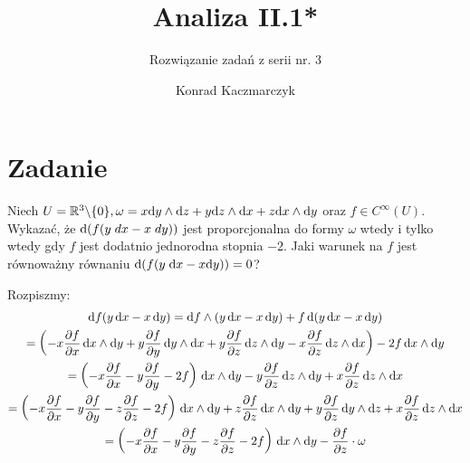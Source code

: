 \documentclass[11pt]{scrartcl}
\author{Konrad Kaczmarczyk}
\begin{document}
\title{Analiza II.1*}
    \subtitle{Rozwiązanie zadań z serii nr. 3}
    \maketitle

    \section{Zadanie}
        
    \begin{zadanie*}
        Niech $
        U = \mathbb R^3 \backslash \{ 0 \}, 
        \omega = x \text{d} y \wedge \text{d} z 
            + y \text{d} z \wedge \text{d} x 
            + z \text{d} x \wedge \text{d} y
        $
        oraz $f \in C^\infty (U)$. Wykazać, że $\text{d} (f(y \; dx - x \; dy))$ jest
        proporcjonalna do formy $\omega$ wtedy i tylko wtedy gdy $f$ jest 
        dodatnio jednorodna stopnia $-2$. Jaki warunek na $f$ jest równoważny 
        równaniu $\text{d} (f(y \; \text{d} x - x \text{d} y)) = 0$?
    \end{zadanie*}

    Rozpiszmy:
    \begin{gather*}
        \text{d} f (y \, \text{d} x - x \, \text{d} y) = 
        \text{d} f \wedge (y \, \text{d} x - x \, \text{d} y) 
            + f \, \text{d} (y \, \text{d} x - x \, \text{d} y) \\
        = \left ( 
            - x \frac{\partial f}{\partial x} \, \text{d} x \wedge \text{d} y 
            + y \frac{\partial f}{\partial y} \, \text{d} y \wedge \text{d} x 
            + y \frac{\partial f}{\partial z} \, \text{d} z \wedge \text{d} y 
            - x \frac{\partial f}{\partial z} \, \text{d} z \wedge \text{d} x 
        \right ) - 2f \, \text{d} x \wedge \text{d} y \\
        = \left ( 
            - x \frac{\partial f}{\partial x} 
            - y \frac{\partial f}{\partial y} - 2f 
        \right ) \, \text{d} x \wedge \text{d} y 
        - y \frac{\partial f}{\partial z} \, \text{d} z \wedge \text{d} y
        + x \frac{\partial f}{\partial z} \, \text{d} z \wedge \text{d} x \\
        = \left ( 
            - x \frac{\partial f}{\partial x} 
            - y \frac{\partial f}{\partial y} 
            - z \frac{\partial f}{\partial z} - 2f
        \right ) \, \text{d} x \wedge \text{d} y 
        + z \frac{\partial f}{\partial z} \, \text{d} x \wedge \text{d} y
        + y \frac{\partial f}{\partial z} \, \text{d} y \wedge \text{d} z
        + x \frac{\partial f}{\partial z} \, \text{d} z \wedge \text{d} x \\
        = \left ( 
            - x \frac{\partial f}{\partial x} 
            - y \frac{\partial f}{\partial y} 
            - z \frac{\partial f}{\partial z} - 2f
        \right ) \, \text{d} x \wedge \text{d} y 
        - \frac{\partial f}{\partial z} \cdot \omega
    \end{gather*}
\end{document}
